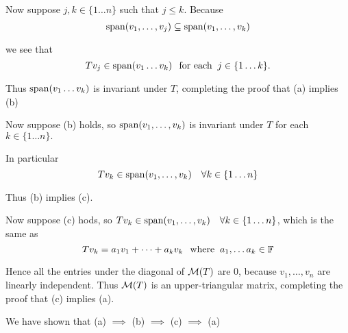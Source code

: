 \begin{prf}
  Now suppose $j, k \in \{1 \ldots n \}$ such that $j \leq  k.$ Because
  \begin{equation}
    \operatorname{span} (v_1, \ldots, v_j) \subseteq \operatorname{span} (v_1, \ldots, v_k)
  \end{equation} 
  
  we see that
  \begin{equation}
    T v_j \in \operatorname{span} (v_1 \ldots v_k) \;\;\, \text{for each}\;\; j \in \{1 \ldots k\}.
  \end{equation}

  Thus $\operatorname{span} (v_1 \ldots v_k)$ is invariant under $T$, completing the proof that (a) implies (b)
  
  Now suppose (b) holds, so $\operatorname{span} (v_1, \ldots, v_k)$ is invariant under $T$ for each $k \in \{1 \ldots n\}.$ 
  
  In particular
  \begin{equation}
    T v_k \in \operatorname{span} (v_1, \ldots, v_k) \quad \forall k \in \{1 \ldots n\}
  \end{equation}
  
  Thus (b) implies (c).
  
  Now suppose (c) hods, so $T v_k \in \operatorname{span} (v_1, \ldots, v_k) \quad \forall k \in \{1 \ldots n\}$, which is the same as
  \begin{equation}
    T v_k = a_1 v_1 + \cdots + a_k v_k \;\;\, \text{where}\;\; a_1, \dots a_k \in \mathbb{F}
  \end{equation}
  
  Hence all the entries under the diagonal of $\mathcal{M} (T)$ are $0$, because $v_1, \ldots, v_n$ are linearly independent. Thus $\mathcal{M}(T)$ is an upper-triangular matrix, completing the proof that (c) implies (a).
  
  We have shown that (a) $\implies$ (b) $\implies$ (c) $\implies$ (a)
\end{prf}

